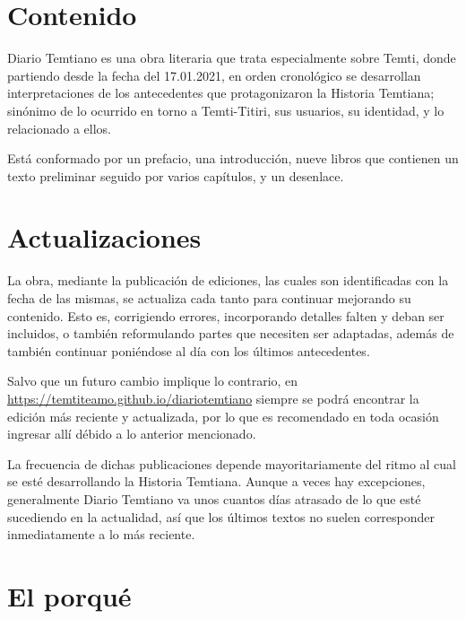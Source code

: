 \documentclass[
  spanish,
]{book}
\begin{document}
\hypertarget{contenido}{%
\section*{Contenido}\label{contenido}}

Diario Temtiano es una obra literaria que trata especialmente sobre Temti, donde partiendo desde la fecha del 17.01.2021, en orden cronológico se desarrollan interpretaciones de los antecedentes que protagonizaron la Historia Temtiana; sinónimo de lo ocurrido en torno a Temti-Titiri, sus usuarios, su identidad, y lo relacionado a ellos.

Está conformado por un prefacio, una introducción, nueve libros que contienen un texto preliminar seguido por varios capítulos, y un desenlace.

\hypertarget{actualizaciones}{%
\section*{Actualizaciones}\label{actualizaciones}}

La obra, mediante la publicación de ediciones, las cuales son identificadas con la fecha de las mismas, se actualiza cada tanto para continuar mejorando su contenido. Esto es, corrigiendo errores, incorporando detalles falten y deban ser incluidos, o también reformulando partes que necesiten ser adaptadas, además de también continuar poniéndose al día con los últimos antecedentes.

Salvo que un futuro cambio implique lo contrario, en \url{https://temtiteamo.github.io/diariotemtiano} siempre se podrá encontrar la edición más reciente y actualizada, por lo que es recomendado en toda ocasión ingresar allí débido a lo anterior mencionado.

La frecuencia de dichas publicaciones depende mayoritariamente del ritmo al cual se esté desarrollando la Historia Temtiana. Aunque a veces hay excepciones, generalmente Diario Temtiano va unos cuantos días atrasado de lo que esté sucediendo en la actualidad, así que los últimos textos no suelen corresponder inmediatamente a lo más reciente.

\hypertarget{el-porquuxe9}{%
\section*{El porqué}\label{el-porquuxe9}}
\end{document}
